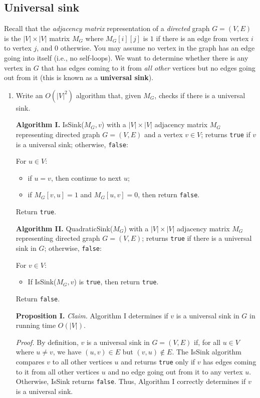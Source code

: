 \subsection{Universal sink}
Recall that the \emph{adjacency matrix} representation of a \emph{directed} graph $G=(V,E)$ is the $|V| \times |V|$ matrix $M_G$ where $M_G[i][j]$ is $1$ if there is an edge from vertex $i$ to vertex $j$, and $0$ otherwise.
You may assume no vertex in the graph has an edge going into itself (i.e., no self-loops). We want to determine whether there is any vertex in $G$ that has edges coming to it from \emph{all other} vertices but no edges going out from it (this is known as a \textbf{universal sink}). 

\begin{enumerate}
\item Write an $O(|V|^2)$ algorithm that, given $M_G$, checks if there is a universal sink.
\begin{solution}

\textbf{Algorithm I. }{\sc IsSink}($M_G,v$) with a $|V|\times|V|$ adjacency matrix $M_G$ representing directed graph $G=(V,E)$ and a vertex $v\in V$; returns \verb|true| if $v$ is a universal sink; otherwise, \verb|false|:

For $u\in V$:
\begin{itemize}
    \item if $u=v$, then continue to next $u$;
    \item if $M_G[v,u]=1$ and $M_G[u,v]=0$, then return \verb|false|.
\end{itemize}
Return \verb|true|.

\textbf{Algorithm II. }{\sc QuadraticSink}($M_G$) with a $|V|\times|V|$ adjacency matrix $M_G$ representing directed graph $G=(V,E)$; returns \verb|true| if there is a universal sink in $G$; otherwise, \verb|false|:

For $v\in V$:
\begin{itemize}
\item If {\sc IsSink}($M_G,v$) is \verb|true|, then return \verb|true|.
\end{itemize}
Return \verb|false|.

\textbf{Proposition I. }\textit{Claim. }Algorithm I determines if $v$ is a universal sink in $G$ in running time $O(|V|)$.

\textit{Proof. }By definition, $v$ is a universal sink in $G=(V,E)$ if, for all $u\in V$ where $u\neq v$, we have $(u,v)\in E$ but $(v,u)\notin E$. The {\sc IsSink} algorithm compares $v$ to all other vertices $u$ and returns \verb|true| only if $v$ has edges coming to it from all other vertices $u$ and no edge going out from it to any vertex $u$. Otherwise, {\sc IsSink} returns \verb|false|. Thus, Algorithm I correctly determines if $v$ is a universal sink.


\end{solution}
\end{enumerate}
